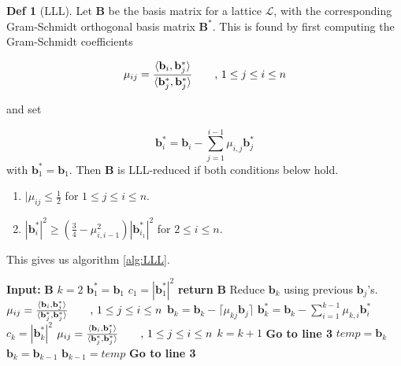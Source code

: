 \documentclass[a4paper, 10pt]{article}
\theoremstyle{definition}
\newtheorem{definition}{Def}[section]
\begin{document}
\begin{definition}[\ac{LLL}]
    Let $\mathbf{B}$ be the basis matrix for a lattice $\mathcal{L}$, with the corresponding Gram-Schmidt orthogonal basis matrix $\mathbf{B}^*$. This is found by first computing the Gram-Schmidt coefficients 
    
    \[\mu _{ij}=\frac{\langle \mathbf{b}_i,\mathbf{b}^*_j\rangle}{\langle\mathbf{b}^*_j,\mathbf{b}^*_j\rangle} \mbox{\qquad , $1 \leq j \leq i \leq n$}\] 
    
    and set
    
    \[\mathbf{b}^*_i=\mathbf{b}_i-\sum_{j=1}^{i-1} \mu _{i,j}\mathbf{b}^*_j\]
    with $\mathbf{b}^*_1=\mathbf{b}_1$. Then $\mathbf{B}$ is LLL-reduced if both conditions below hold.
    \begin{enumerate}
        \item $|\mu_{ij} \leq \frac{1}{2}$ for $1 \leq j \leq i \leq n$.
        \item $|\mathbf{b}^*_i|^2 \geq (\frac{3}{4} - \mu ^2_{i,i-1})|\mathbf{b}^*_{i_1}|^2$ for $2 \leq i \leq n$.
    \end{enumerate}
    This gives us algorithm \ref{alg:LLL}.
    \begin{algorithm}[h]
        \caption{\ac{LLL}}\label{alg:LLL}
        \begin{algorithmic}[1]
        \State \textbf{Input:} $\mathbf{B}$
        \State $k=2$
        \State $\mathbf{b}^*_1=\mathbf{b}_1$
        \State $c_1 = |\mathbf{b}^*_1|^2$
            \State \textbf{return} $\mathbf{B}$
        \EndIf
         \Comment Reduce $\mathbf{b}_k$ using previous $\mathbf{b}_j$'s.
            \State  $\mu _{ij}=\frac{\langle \mathbf{b}_i,\mathbf{b}^*_j\rangle}{\langle\mathbf{b}^*_j,\mathbf{b}^*_j\rangle} \mbox{\qquad , $1 \leq j \leq i \leq n$}$
            \State $\mathbf{b}_k = \mathbf{b}_k - \lceil \mu _{kj}\mathbf{b}_j \rceil$
            \State $\mathbf{b}^*_k = \mathbf{b}_k-\sum_{i=1}^{k-1} \mu _{k,i}\mathbf{b}^*_i$
            \State $c_k=|\mathbf{b}_k^*|^2$
            \State  $\mu _{ij}=\frac{\langle \mathbf{b}_i,\mathbf{b}^*_j\rangle}{\langle\mathbf{b}^*_j,\mathbf{b}^*_j\rangle} \mbox{\qquad , $1 \leq j \leq i \leq n$}$
        \EndFor
            \State $k=k+1$
            \State \textbf{Go to line 3}
        \Else
            \State $temp = \mathbf{b}_k$
            \State $\mathbf{b}_k = \mathbf{b}_{k-1}$
            \State $\mathbf{b}_{k-1} = temp$
            \State \textbf{Go to line 3}
        \EndIf
        \end{algorithmic}
    \end{algorithm}
\end{definition}
\end{document}
